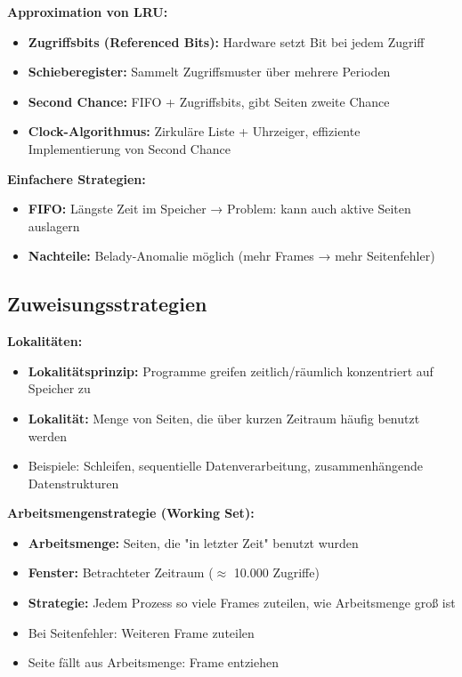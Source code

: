 \documentclass[9pt,a4paper]{extarticle}
\begin{document}
\begin{multicols*}{2}
\textbf{Approximation von LRU:}
\begin{itemize}
\item \textbf{Zugriffsbits (Referenced Bits):} Hardware setzt Bit bei jedem Zugriff
\item \textbf{Schieberegister:} Sammelt Zugriffsmuster über mehrere Perioden
\item \textbf{Second Chance:} FIFO + Zugriffsbits, gibt Seiten zweite Chance
\item \textbf{Clock-Algorithmus:} Zirkuläre Liste + Uhrzeiger, effiziente Implementierung von Second Chance
\end{itemize}

\textbf{Einfachere Strategien:}
\begin{itemize}
\item \textbf{FIFO:} Längste Zeit im Speicher → Problem: kann auch aktive Seiten auslagern
\item \textbf{Nachteile:} Belady-Anomalie möglich (mehr Frames → mehr Seitenfehler)
\end{itemize}

\subsection{Zuweisungsstrategien}
\textbf{Lokalitäten:}
\begin{itemize}
\item \textbf{Lokalitätsprinzip:} Programme greifen zeitlich/räumlich konzentriert auf Speicher zu
\item \textbf{Lokalität:} Menge von Seiten, die über kurzen Zeitraum häufig benutzt werden
\item Beispiele: Schleifen, sequentielle Datenverarbeitung, zusammenhängende Datenstrukturen
\end{itemize}

\textbf{Arbeitsmengenstrategie (Working Set):}
\begin{itemize}
\item \textbf{Arbeitsmenge:} Seiten, die "in letzter Zeit" benutzt wurden
\item \textbf{Fenster:} Betrachteter Zeitraum ($\approx$ 10.000 Zugriffe)
\item \textbf{Strategie:} Jedem Prozess so viele Frames zuteilen, wie Arbeitsmenge groß ist
\item Bei Seitenfehler: Weiteren Frame zuteilen
\item Seite fällt aus Arbeitsmenge: Frame entziehen
\end{itemize}


\end{multicols*}
\end{document}
